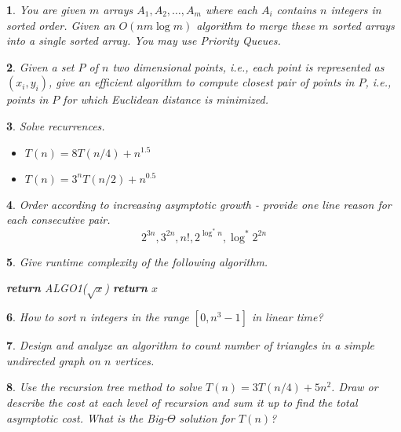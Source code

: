 \documentclass[%
addpoints]{exam}
\theoremstyle{problem}
\newtheorem{p}{}
\begin{document}
\begin{p}
You are given $m$ arrays $A_1, A_2,\ldots, A_m$ where each $A_i$ contains $n$ integers in sorted order. Given an $O(nm\log m)$ algorithm to merge these $m$ sorted arrays into a single sorted array. You may use Priority Queues.
\hfill \end{p}

\begin{p}
Given a set $P$ of $n$ two dimensional points, i.e., each point is represented as $(x_i,y_i)$, give an efficient algorithm to compute closest pair of points in $P$, i.e., points in $P$ for which Euclidean distance is minimized.
\hfill \end{p}

\begin{p}
Solve recurrences.
\hfill \end{p}
\begin{itemize}
			\item $T(n) = 8T(n/4) + n^{1.5}$
			\item $T(n) = 3^nT(n/2) + n^{0.5}$
\end{itemize}

\begin{p}
Order according to increasing asymptotic growth - provide one line reason for each consecutive pair.
\[
2^{3n},3^{2n},n!,2^{\log^*n},\log^* 2^{2n}
\]
\hfill \end{p}

\begin{p}
Give runtime complexity of the following algorithm.
\begin{algorithm}[!ht]
	\label{algo1}
	\begin{algorithmic}
		 
		\State \textbf{return} ALGO1($\sqrt{x}$)
		\Else
		\State \textbf{return} $x$
		\EndIf
		\EndProcedure
	\end{algorithmic}
\end{algorithm}
\hfill \end{p}

\begin{p}
How to sort $n$ integers in the range $[0,n^3-1]$ in linear time?
\hfill \end{p}

\begin{p}
Design and analyze an algorithm to count number of triangles in a simple undirected graph on $n$ vertices.
\hfill \end{p}

\begin{p}
Use the recursion tree method to solve \(T(n) = 3T(n/4) + 5n^2\). Draw or describe the cost at each level of recursion and sum it up to find the total asymptotic cost. What is the Big-\(\Theta\) solution for \(T(n)\)?  
\hfill\end{p}
\end{document}
